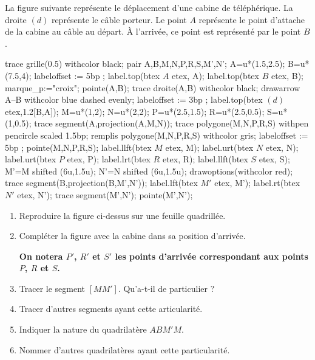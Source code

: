 \begin{activite}[La cabine]    
    La figure suivante représente le déplacement d'une cabine de téléphérique. La droite $(d)$ représente le câble porteur.
    Le point $A$ représente le point d'attache de la cabine au câble au départ. À l'arrivée, ce point est représenté par le point $B$.

    \begin{center}
        \begin{Geometrie}[CoinHD={(11u,5u)}]
            trace grille(0.5) withcolor black;
            pair A,B,M,N,P,R,S,M',N';
            A=u*(1.5,2.5);
            B=u*(7.5,4);
            labeloffset := 5bp ;
            label.top(btex $A$ etex, A);
            label.top(btex $B$ etex, B);
            marque_p:="croix";
            pointe(A,B);
            trace droite(A,B) withcolor black;
            drawarrow A--B withcolor blue dashed evenly;
            labeloffset := 3bp ;
            label.top(btex $(d)$ etex,1.2[B,A]);
            M=u*(1,2);
            N=u*(2,2);
            P=u*(2.5,1.5);
            R=u*(2.5,0.5);
            S=u*(1,0.5);
            trace segment(A,projection(A,M,N));
            trace polygone(M,N,P,R,S) withpen pencircle scaled 1.5bp;
            remplis polygone(M,N,P,R,S) withcolor gris;
            labeloffset := 5bp ;
            pointe(M,N,P,R,S);
            label.llft(btex  $M$ etex, M);
            label.urt(btex  $N$ etex, N);
            label.urt(btex  $P$ etex, P);
            label.lrt(btex  $R$ etex, R);
            label.llft(btex $S$ etex, S);
            M'=M shifted (6u,1.5u);
            N'=N shifted (6u,1.5u);
            drawoptions(withcolor red);
            trace segment(B,projection(B,M',N'));
            label.lft(btex $M'$ etex, M');
            label.rt(btex $N'$ etex, N');
            trace segment(M',N');
            pointe(M',N');
        \end{Geometrie}
    \end{center}
        \begin{enumerate}
        \item Reproduire la figure ci-dessus sur une feuille quadrillée.
        \item Compléter la figure avec la cabine dans sa position d'arrivée.
        
        \smallskip
        {\bfseries On notera $P'$, $R'$ et $S'$ les points d'arrivée correspondant aux points $P$, $R$ et $S$.}
        \smallskip
        \item Tracer le segment $[MM']$. Qu'a-t-il de particulier ?
        \item Tracer d'autres segments ayant cette articularité.
        \item Indiquer la nature du quadrilatère $ABM'M$.
        \item Nommer d'autres quadrilatères ayant cette particularité.
        

\end{enumerate}
\end{activite}
